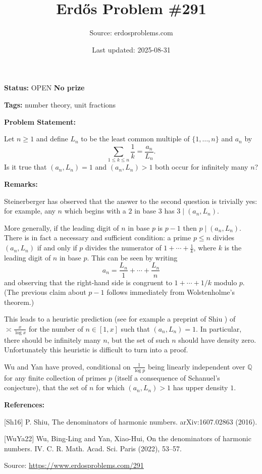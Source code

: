 \documentclass{article}
\title{Erd\H{o}s Problem \#291}
\date{Last updated: 2025-08-31}
\author{Source: erdosproblems.com}
\begin{document}
\maketitle

\noindent\textbf{Status:} OPEN \quad \textbf{No prize}

\noindent\textbf{Tags:} number theory, unit fractions

\medskip
\noindent\textbf{Problem Statement:}

Let $n\geq 1$ and define $L_n$ to be the least common multiple of $\{1,\ldots,n\}$ and $a_n$ by\[\sum_{1\leq k\leq n}\frac{1}{k}=\frac{a_n}{L_n}.\]Is it true that $(a_n,L_n)=1$ and $(a_n,L_n)>1$ both occur for infinitely many $n$?

\bigskip
\noindent\textbf{Remarks:}

Steinerberger has observed that the answer to the second question is trivially yes: for example, any $n$ which begins with a $2$ in base $3$ has $3\mid (a_n,L_n)$.

More generally, if the leading digit of $n$ in base $p$ is $p-1$ then $p\mid (a_n,L_n)$. There is in fact a necessary and sufficient condition: a prime $p\leq n$ divides $(a_n,L_n)$ if and only if $p$ divides the numerator of $1+\cdots+\frac{1}{k}$, where $k$ is the leading digit of $n$ in base $p$. This can be seen by writing\[a_n = \frac{L_n}{1}+\cdots+\frac{L_n}{n}\]and observing that the right-hand side is congruent to $1+\cdots+1/k$ modulo $p$. (The previous claim about $p-1$ follows immediately from Wolstenholme's theorem.)

This leads to a heuristic prediction (see for example a preprint of Shiu \cite{Sh16}) of $\asymp\frac{x}{\log x}$ for the number of $n\in [1,x]$ such that $(a_n,L_n)=1$. In particular, there should be infinitely many $n$, but the set of such $n$ should have density zero. Unfortunately this heuristic is difficult to turn into a proof.

Wu and Yan \cite{WuYa22} have proved, conditional on $\frac{1}{\log p}$ being linearly independent over $\mathbb{Q}$ for any finite collection of primes $p$ (itself a consequence of Schanuel's conjecture), that the set of $n$ for which $(a_n,L_n)>1$ has upper density $1$.

\bigskip
\noindent\textbf{References:}

[Sh16] P. Shiu, The denominators of harmonic numbers. arXiv:1607.02863 (2016).
 
 [WuYa22] Wu, Bing-Ling and Yan, Xiao-Hui, On the denominators of harmonic numbers. {IV}. C. R. Math. Acad. Sci. Paris (2022), 53--57.

\bigskip
\noindent\small{Source: \url{https://www.erdosproblems.com/291}}
\end{document}
